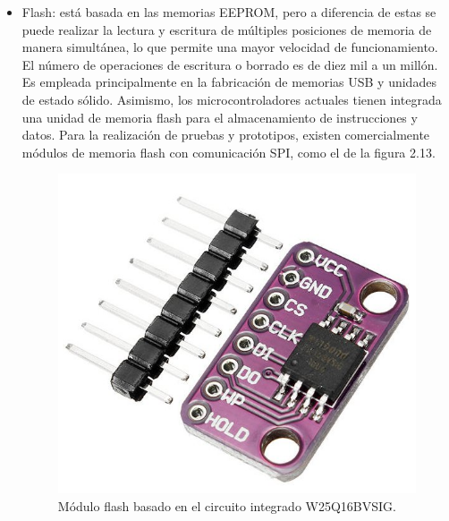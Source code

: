 \begin{itemize}

	\item Flash: está basada en las memorias EEPROM, pero a diferencia de estas se puede realizar la lectura y escritura de múltiples posiciones de memoria de manera simultánea, lo que permite una mayor velocidad de funcionamiento. El número de operaciones de escritura o borrado es de diez mil a un millón. Es empleada principalmente en la fabricación de memorias USB y unidades de estado sólido. Asimismo, los microcontroladores actuales tienen integrada una unidad de memoria flash para el almacenamiento de instrucciones y datos. Para la realización de pruebas y prototipos, existen comercialmente módulos de memoria flash con comunicación SPI, como el de la figura 2.13.
	\begin{figure}[h]
		\centering
		\includegraphics[scale=0.28]{./Figures/flash.jpg}
		\caption{Módulo flash basado en el circuito integrado W25Q16BVSIG\protect\footnotemark.}
		\label{fig:cuadradoAzul}
	\end{figure}

	
\end{itemize}


